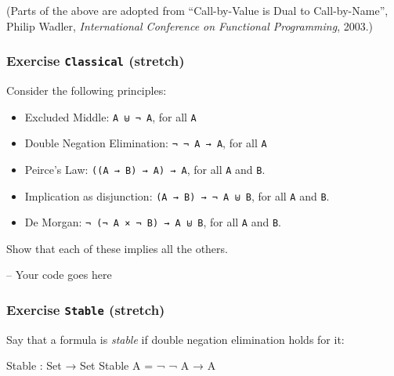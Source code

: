 (Parts of the above are adopted from ``Call-by-Value is Dual to
Call-by-Name'', Philip Wadler, \emph{International Conference on
Functional Programming}, 2003.)

\hypertarget{exercise-classical-stretch}{%
\subsubsection{\texorpdfstring{Exercise \texttt{Classical}
(stretch)}{Exercise Classical (stretch)}}\label{exercise-classical-stretch}}

Consider the following principles:

\begin{itemize}
\tightlist
\item
  Excluded Middle: \texttt{A\ ⊎\ ¬\ A}, for all \texttt{A}
\item
  Double Negation Elimination: \texttt{¬\ ¬\ A\ →\ A}, for all
  \texttt{A}
\item
  Peirce's Law: \texttt{((A\ →\ B)\ →\ A)\ →\ A}, for all \texttt{A} and
  \texttt{B}.
\item
  Implication as disjunction: \texttt{(A\ →\ B)\ →\ ¬\ A\ ⊎\ B}, for all
  \texttt{A} and \texttt{B}.
\item
  De Morgan: \texttt{¬\ (¬\ A\ ×\ ¬\ B)\ →\ A\ ⊎\ B}, for all \texttt{A}
  and \texttt{B}.
\end{itemize}

Show that each of these implies all the others.

\begin{fence}
\begin{code}
-- Your code goes here
\end{code}
\end{fence}

\hypertarget{exercise-stable-stretch}{%
\subsubsection{\texorpdfstring{Exercise \texttt{Stable}
(stretch)}{Exercise Stable (stretch)}}\label{exercise-stable-stretch}}

Say that a formula is \emph{stable} if double negation elimination holds
for it:

\begin{fence}
\begin{code}
Stable : Set → Set
Stable A = ¬ ¬ A → A
\end{code}
\end{fence}

